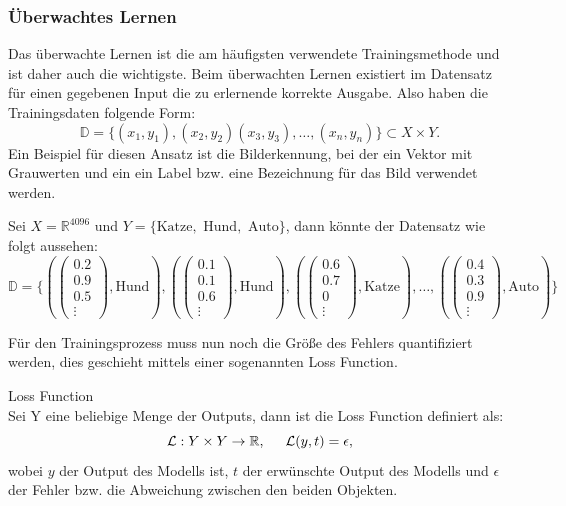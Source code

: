 \documentclass[12pt,letterpaper,ngerman]{article}
\begin{document}
\subsubsection{Überwachtes Lernen}
Das überwachte Lernen ist die am häufigsten verwendete Trainingsmethode
und ist daher auch die wichtigste. Beim überwachten Lernen existiert 
im Datensatz für einen gegebenen Input die zu erlernende
korrekte Ausgabe. Also haben die Trainingsdaten folgende Form:
  \[\mathbb{D} = \{ (x_1,y_1), (x_2,y_2) (x_3,y_3), \dots ,(x_n,y_n)\} 
  \subset X \times Y.\]
Ein Beispiel für diesen Ansatz ist die Bilderkennung, bei der ein Vektor
mit Grauwerten und ein ein Label bzw. eine Bezeichnung für das Bild
verwendet werden.
\begin{example}
  Sei $X = \mathbb{R}^{4096}$ und
   $Y = \{ \text{Katze}, \text{ Hund}, \text{ Auto}\}$, dann könnte der 
   Datensatz wie folgt aussehen:
   \[
     \mathbb{D} = \{
     (\begin{pmatrix} 0.2 \\ 0.9 \\ 0.5 \\ \vdots \end{pmatrix}, \text{Hund}),
     (\begin{pmatrix} 0.1 \\ 0.1 \\ 0.6 \\ \vdots \end{pmatrix}, \text{Hund}),
     (\begin{pmatrix} 0.6 \\ 0.7 \\ 0 \\ \vdots \end{pmatrix}, \text{Katze}),
     \dots, 
     (\begin{pmatrix} 0.4 \\ 0.3 \\ 0.9 \\ \vdots \end{pmatrix}, \text{Auto})
    \}
   \]
\end{example}
Für den Trainingsprozess muss nun noch die Größe des Fehlers 
quantifiziert werden, dies geschieht mittels einer sogenannten
Loss Function.
\begin{definition}{Loss Function}
  \\
  Sei Y eine beliebige Menge der Outputs, dann
  ist die Loss Function definiert als:
  \[ \mathcal{L}: Y \times Y \to \mathbb{R}, 
  \hspace{0.5cm} \mathcal{L}(y,t) = \epsilon, \]
  wobei $y$ der Output des Modells ist, $t$ der erwünschte Output
  des Modells und $\epsilon$ der Fehler bzw. die Abweichung zwischen 
  den beiden Objekten.
\end{definition}
\end{document}
